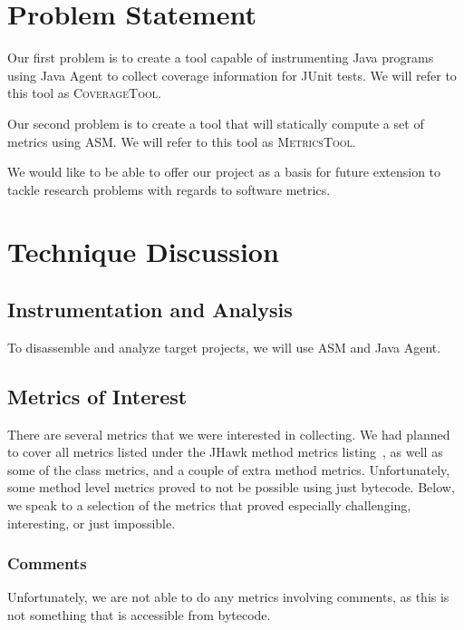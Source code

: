 \newcommand{\ct}{\mbox{\textsc{CoverageTool}}}
\newcommand{\mt}{\mbox{\textsc{MetricsTool}}}

\section{Problem Statement}

Our first problem is to create a tool capable of instrumenting Java programs using Java Agent to collect coverage information for JUnit tests. We will refer to this tool as \ct{}.

Our second problem is to create a tool that will statically compute a set of metrics using ASM. We will refer to this tool as \mt{}.

We would like to be able to offer our project as a basis for future extension to tackle research problems with regards to software metrics. 

\section{Technique Discussion}

\subsection{Instrumentation and Analysis}

To disassemble and analyze target projects, we will use ASM and Java Agent.

\subsection{Metrics of Interest}

There are several metrics that we were interested in  collecting. We had planned to cover all metrics listed under the JHawk method metrics listing~\cite{jhawkmetrics}, as well as some of the class metrics, and a couple of extra method metrics. Unfortunately, some method level metrics proved to not be possible using just bytecode. Below, we speak to a selection of the metrics that proved especially challenging, interesting, or just impossible.

\subsubsection{Comments}

Unfortunately, we are not able to do any metrics involving comments, as this is not something that is accessible from bytecode. 

